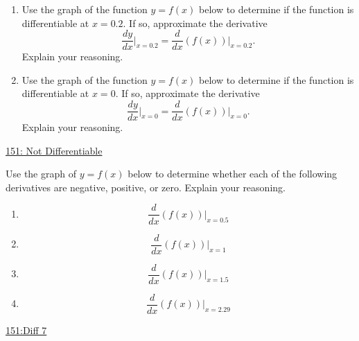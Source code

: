\documentclass{ximera}
\begin{document}
\begin{exploration} \label{Exp4dfd44444g4}
\begin{enumerate}

\item Use the graph of the function $y=f(x)$ below to determine if the function is differentiable at $x=0.2$. If so, approximate the derivative
\[
      \frac{dy}{dx}\Big|_{x=0.2} = \frac{d}{dx}\left( f(x) \right) \Big|_{x=0.2}.
\]
Explain your reasoning.

\item Use the graph of the function $y=f(x)$ below to determine if the function is differentiable at $x=0$. If so, approximate the derivative
\[
      \frac{dy}{dx}\Big|_{x=0} = \frac{d}{dx}\left( f(x) \right) \Big|_{x=0}.
\]
Explain your reasoning.


\end{enumerate}

\begin{onlineOnly}
    \begin{center}
\end{center}
\end{onlineOnly}

\href{https://www.desmos.com/calculator/tvwtbx9hco}{151: Not Differentiable}
\end{exploration}


\begin{exploration} \label{Expt666776665221}
Use the graph of $y=f(x)$ below to determine whether each of the following derivatives are negative, positive, or zero. Explain your reasoning.

\begin{enumerate}
\item 
\[
\frac{d}{dx}\left( f(x) \right)\Big|_{x=0.5}
\]

\item 
\[
\frac{d}{dx}\left( f(x) \right)\Big|_{x=1}
\]

\item 
\[
\frac{d}{dx}\left( f(x) \right)\Big|_{x=1.5}
\]

\item 
\[
\frac{d}{dx}\left( f(x) \right)\Big|_{x=2.29}
\]
\end{enumerate}

\begin{onlineOnly}
    \begin{center}
\end{center}
\end{onlineOnly}

\href{https://www.desmos.com/calculator/ks2yui6ofs}{151:Diff 7}


\end{exploration}
\end{document}
